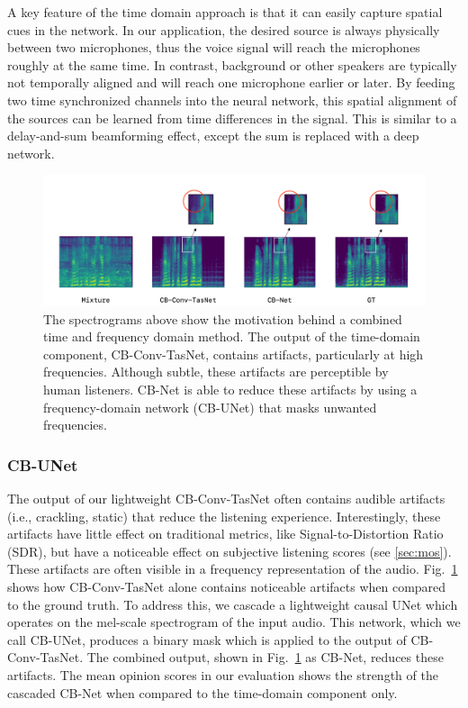 \documentclass [11pt, proquest] {uwthesis}[2020/02/24]
\begin{document}
A key feature of the time domain approach is that it can easily capture spatial cues in the network. In our application, the desired source is always physically between  two  microphones, thus the voice signal will reach the microphones roughly at the same time. In contrast,  background or other speakers are typically not temporally aligned and will reach one microphone earlier or later. By feeding two time synchronized channels into the neural network, this spatial alignment of the sources can be learned from time differences in the signal. This is similar to a delay-and-sum beamforming effect, except the sum is replaced with a deep network. %

\begin{figure}
\centering
\includegraphics[width=0.75\linewidth]{CB_figures/spectrogram_motivation2.png}
\vskip -0.15in
\caption{{The spectrograms above show the motivation behind a combined time and frequency domain method. The output of the time-domain component, CB-Conv-TasNet, contains artifacts, particularly at high frequencies. Although subtle, these artifacts are perceptible by human listeners. CB-Net is able to reduce these artifacts by using a frequency-domain network (CB-UNet) that masks unwanted frequencies.}}
\vskip -0.2in
\label{fig:spectrogram-motivation}
\end{figure}

\subsubsection{CB-UNet}
 {The output of our lightweight CB-Conv-TasNet often contains audible artifacts (i.e., crackling, static) that reduce the listening experience. Interestingly, these artifacts have little effect on traditional metrics, like Signal-to-Distortion Ratio (SDR), but have a noticeable effect on subjective listening scores (see \ref{sec:mos}). These artifacts are often visible in a frequency representation of the audio.  Fig.~\ref{fig:spectrogram-motivation} shows how  CB-Conv-TasNet alone contains noticeable artifacts when compared to the ground truth. To address this, we cascade a lightweight causal UNet \cite{ronneberger2015unet} which operates on the mel-scale spectrogram of the input audio. This network, which we call CB-UNet, produces a binary mask which is applied to the output of CB-Conv-TasNet. The combined output, shown in Fig.~\ref{fig:spectrogram-motivation} as CB-Net,  reduces these artifacts. The mean opinion scores in our evaluation  shows the strength of the cascaded CB-Net when compared to the time-domain component only.}
\end{document}
